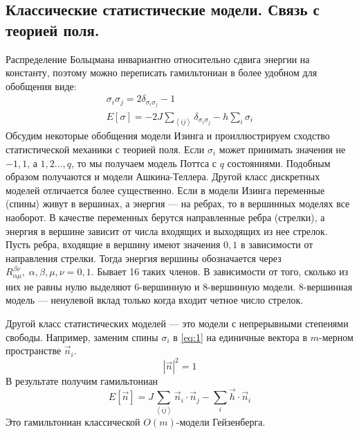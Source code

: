 \documentclass[a4paper,12pt]{article}
\theoremstyle{definition}
\theoremstyle{definition}
\theoremstyle{definition}
\begin{document}
\subsection{Классические статистические модели. Связь с теорией поля.}
\label{sec:statistical-models-qft}

Распределение Больцмана инвариантно относительно сдвига энергии на константу, поэтому можно переписать гамильтониан в более удобном для обобщения виде:
\begin{equation}
  \label{eq:12}
  \begin{array}{l}
    \sigma_i\sigma_j=2\delta_{\sigma_i\sigma_j}-1\\
    E[\sigma]=-2J\sum_{\left<ij\right>}\delta_{\sigma_i\sigma_j}-h\sum_i \sigma_i
  \end{array}
\end{equation}
Обсудим некоторые обобщения модели Изинга и проиллюстрируем сходство статистической механики с теорией поля.
Если $\sigma_i$ может принимать значения не $-1,1$, а $1,2\dots,q$, то мы получаем модель Поттса с $q$ состояниями.
Подобным образом получаются и модели Ашкина-Теллера.
Другой класс дискретных моделей отличается более существенно. Если в модели Изинга переменные (спины) живут в вершинах, а энергия --- на ребрах, то в вершинных моделях все наоборот. В качестве переменных берутся направленные ребра (стрелки), а энергия в вершине зависит от числа входящих и выходящих из нее стрелок. Пусть ребра, входящие в вершину имеют значения $0,1$ в зависимости от направления стрелки. Тогда энергия вершины обозначается через $R_{\alpha\mu}^{\beta\nu},\; \alpha,\beta,\mu,\nu=0,1$. Бывает 16 таких членов. В зависимости от того, сколько из них не равны нулю выделяют 6-вершинную и 8-вершинную модели. 8-вершинная модель --- ненулевой вклад только когда входит четное число стрелок. 

Другой класс статистических моделей --- это модели с непрерывными степенями свободы. Например, заменим спины $\sigma_i$ в \eqref{eq:1} на единичные вектора в $m$-мерном пространстве $\vec n_i$.
\begin{equation}
  \label{eq:14}
  \left|\vec n\right|^2=1
\end{equation}
В результате получим гамильтониан
\begin{equation}
  \label{eq:13}
  E[\vec n]=J\sum_{\left<ij\right>}\vec n_i\cdot \vec n_j-\sum_i \vec h\cdot \vec n_i
\end{equation}
Это гамильтониан классической $O(m)$-модели Гейзенберга. 
\end{document}
